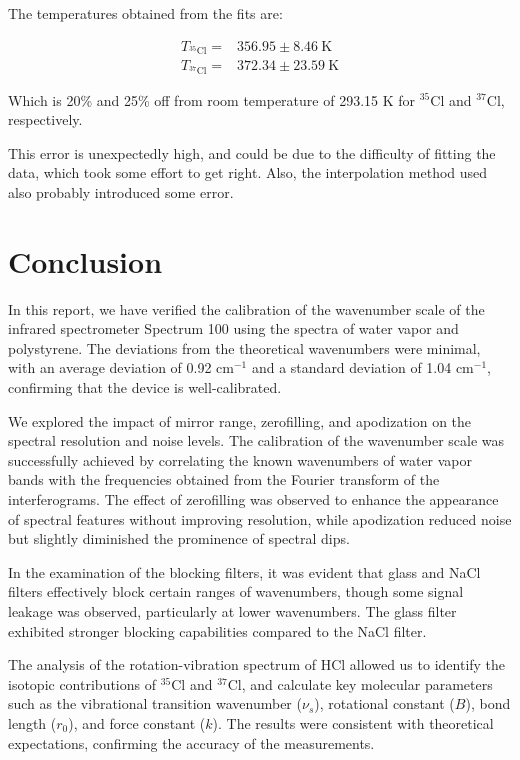 \documentclass{article}
\begin{document}
The temperatures obtained from the fits are: 

\begin{align*}
	T_{^{35} \mathrm{Cl}} =& 356.95 \pm 8.46 \ \text{K}
	\\
	T_{^{37} \mathrm{Cl}} =& 372.34 \pm 23.59 \ \text{K}
\end{align*}

Which is 20\% and 25\% off from room temperature of 293.15 K for $^{35} \mathrm{Cl}$ and $^{37} \mathrm{Cl}$, respectively.

This error is unexpectedly high, and could be due to the difficulty of fitting the data, which took some effort to get right. Also, the interpolation method used also probably introduced some error.

\pagebreak{}

\section{Conclusion}

In this report, we have verified the calibration of the wavenumber scale of the infrared spectrometer Spectrum 100 using the spectra of water vapor and polystyrene. The deviations from the theoretical wavenumbers were minimal, with an average deviation of 0.92 cm$^{-1}$ and a standard deviation of 1.04 cm$^{-1}$, confirming that the device is well-calibrated.

We explored the impact of mirror range, zerofilling, and apodization on the spectral resolution and noise levels. The calibration of the wavenumber scale was successfully achieved by correlating the known wavenumbers of water vapor bands with the frequencies obtained from the Fourier transform of the interferograms. The effect of zerofilling was observed to enhance the appearance of spectral features without improving resolution, while apodization reduced noise but slightly diminished the prominence of spectral dips.

In the examination of the blocking filters, it was evident that glass and NaCl filters effectively block certain ranges of wavenumbers, though some signal leakage was observed, particularly at lower wavenumbers. The glass filter exhibited stronger blocking capabilities compared to the NaCl filter.

The analysis of the rotation-vibration spectrum of HCl allowed us to identify the isotopic contributions of $^{35}$Cl and $^{37}$Cl, and calculate key molecular parameters such as the vibrational transition wavenumber ($\nu_s$), rotational constant ($B$), bond length ($r_0$), and force constant ($k$). The results were consistent with theoretical expectations, confirming the accuracy of the measurements.
\end{document}
